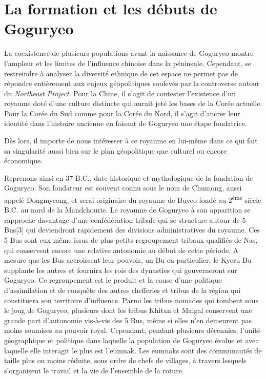 \documentclass[11pt,a4paper]{article}
\begin{document}
\section{La formation et les débuts de Goguryeo}

La coexistence de plusieurs populations avant la naissance de Goguryeo montre l’ampleur et les limites de l’influence chinoise dans la péninsule. Cependant, se restreindre à analyser la diversité ethnique de cet espace ne permet pas de répondre entièrement aux enjeux géopolitiques soulevés par la controverse autour du \emph{Northeast Project}. Pour la Chine, il s’agit de contester l’existence d’un royaume doté d’une culture distincte qui aurait jeté les bases de la Corée actuelle. Pour la Corée du Sud comme pour la Corée du Nord, il s’agit d’ancrer leur identité dans l’histoire ancienne en faisant de Goguryeo une étape fondatrice.

Dès lors, il importe de nous intéresser à ce royaume en lui-même dans ce qui fait sa singularité aussi bien sur le plan géopolitique que culturel ou encore économique.

Reprenons ainsi en 37 B.C., date historique et mythologique de la fondation de Goguryeo. Son fondateur est souvent connu sous le nom de Chumong, aussi appelé Dongmyeong, et serai originaire du royaume de Buyeo fondé au 2\textsuperscript{ème} siècle B.C. au nord de la Mandchourie. Le royaume de Goguryeo à son apparition se rapproche davantage d'une confédération tribale qui se structure autour de 5 Bus{[}3{]} qui deviendront rapidement des divisions administratives du royaume. Ces 5 Bus sont eux même issus de plus petits regroupement tribaux qualifiés de Nas, qui conservent encore une relative autonomie au début de cette période. A mesure que les Bus accroissent leur pouvoir, un Bu en particulier, le Kyeru Bu supplante les autres et fournira les rois des dynasties qui gouverneront sur Goguryeo. Ce regroupement est le produit et la cause d'une politique d'assimilation et de conquête des autres chefferies et tribus de la région qui constituera son territoire d'influence. Parmi les tribus nomades qui tombent sous le joug de Goguryeo, plusieurs dont les tribus Khitan et Malgal conservent une grande part d'autonomie vis-à-vis des 5 Bus, même si elles n'en demeurent pas moins soumises au pouvoir royal. Cependant, pendant plusieurs décennies, l'unité géographique et politique dans laquelle la population de Goguryeo évolue et avec laquelle elle interagit le plus est l'eumnak. Les eumnaks sont des communautés de taille plus ou moins réduite, sous ordre de chefs de villages, à travers lesquels s'organisent le travail et la vie de l'ensemble de la roture.
\end{document}
